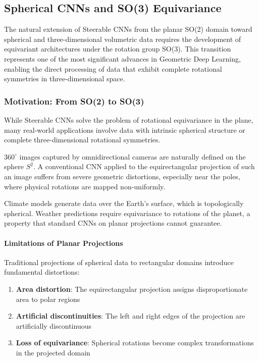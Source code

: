 \subsection{Spherical CNNs and SO(3) Equivariance}\label{subsec:spherical_cnns_so3}

The natural extension of Steerable CNNs from the planar SO(2) domain toward spherical and three-dimensional volumetric data requires the development of equivariant architectures under the rotation group SO(3). This transition represents one of the most significant advances in Geometric Deep Learning, enabling the direct processing of data that exhibit complete rotational symmetries in three-dimensional space.

\subsubsection{Motivation: From SO(2) to SO(3)}

While Steerable CNNs solve the problem of rotational equivariance in the plane, many real-world applications involve data with intrinsic spherical structure or complete three-dimensional rotational symmetries.

\begin{example}
$360^\circ$ images captured by omnidirectional cameras are naturally defined on the sphere $S^2$. A conventional CNN applied to the equirectangular projection of such an image suffers from severe geometric distortions, especially near the poles, where physical rotations are mapped non-uniformly.
\end{example}

\begin{example}
Climate models generate data over the Earth's surface, which is topologically spherical. Weather predictions require equivariance to rotations of the planet, a property that standard CNNs on planar projections cannot guarantee.
\end{example}

\paragraph{Limitations of Planar Projections}

Traditional projections of spherical data to rectangular domains introduce fundamental distortions:

\begin{enumerate}
    \item \textbf{Area distortion}: The equirectangular projection assigns disproportionate area to polar regions
    \item \textbf{Artificial discontinuities}: The left and right edges of the projection are artificially discontinuous
    \item \textbf{Loss of equivariance}: Spherical rotations become complex transformations in the projected domain
\end{enumerate}


